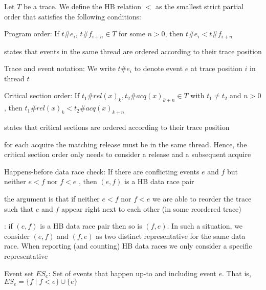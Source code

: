 \documentclass[landscape, a4paper]{article}
\begin{document}
\begin{minipage}[t]{0.2\linewidth}
\begin{betterlist}
\begin{betterlist}
			\item Let $T$ be a trace. We define the HB relation $<$ as the smallest strict partial order that satisfies the following conditions:
			\begin{betterlist}
				\item \alert{Program order:} If $t\#e_i$, $t\#f_{i + n} \in T$ for some $n > 0$, then $t\#e_i < t\#f_{i + n}$
				\begin{betterlist}
					\item states that events in the same thread are ordered according to their trace position
					\item \alert{Trace and event notation}: We write $t\#e_i$ to denote event $e$ at trace position $i$ in thread $t$
				\end{betterlist}
				\item \alert{Critical section order:} If $t_1\#rel(x)_k, t_2\#acq(x)_{k + n} \in T$ with $t_1 \ne t_2$ and $n > 0$, then $t_1\#rel(x)_k < t_2\#acq(x)_{k + n}$
				\begin{betterlist}
					\item states that critical sections are ordered according to their trace position
					\item for each acquire the matching release must be in the same thread. Hence, the critical section order only needs to consider a release and a subsequent acquire
				\end{betterlist}
			\end{betterlist}
			\item \alert{Happens-before data race check:} If there are conflicting events $e$ and $f$ but neither $e < f$ nor $f < e$ , then $(e, f)$ is a HB data race pair
			\begin{betterlist}
				\item the argument is that if neither $e < f$ nor $f < e$ we are able to reorder the trace such that $e$ and $f$ appear right next to each other (in some reordered trace)
				\item {}: if $(e, f)$ is a HB data race pair then so is $(f, e)$. In such a situation, we consider $(e, f)$ and $(f, e)$ as two distinct representative for the same data race. When reporting (and counting) HB data races we only consider a specific representative
			\end{betterlist}
			\item \alert{Event set $ES_e$}: Set of events that happen up-to and including event $e$. That is, $ES_e = \{ f ∣ f < e \} \cup \{e\}$
			\begin{betterlist}

\end{betterlist}
\end{betterlist}
\end{betterlist}
\end{minipage}
\end{document}

